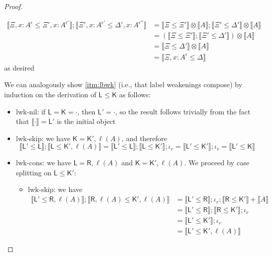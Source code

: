 \documentclass[acmsmall,screen,review]{acmart}
\newcommand{\mb}[1]{\ensuremath{\mathbf{#1}}}
\newcommand{\ms}[1]{\ensuremath{\mathsf{#1}}}
\newcommand{\thyp}[3]{#1 : {#2}^{#3}}
\newcommand{\brle}[1]{{\textsf{#1}}}
\newcommand{\dnt}[1]{\llbracket{#1}\rrbracket}
\begin{document}
\begin{proof}
\begin{itemize}
\begin{itemize}
\begin{equation}
\begin{aligned}
        \dnt{\Xi, \thyp{x}{A}{\epsilon} \leq \Xi', \thyp{x}{A}{\epsilon'}} ; 
        \dnt{\Xi', \thyp{x}{A}{\epsilon'} \leq \Delta', \thyp{x}{A}{\epsilon''}}
        &= \dnt{\Xi \leq \Xi'} \otimes \dnt{A} ; \dnt{\Xi' \leq \Delta'} \otimes \dnt{A} \\
        &= (\dnt{\Xi \leq \Xi'} ; \dnt{\Xi' \leq \Delta'}) \otimes \dnt{A} \\
        &= \dnt{\Xi \leq \Delta'} \otimes \dnt{A} \\
        &= \dnt{\Xi, \thyp{x}{A}{\epsilon} \leq \Delta}
        \end{aligned}
      \end{equation}
      as desired
    \end{itemize}
  \end{itemize}
  We can analogously show \ref{itm:lbwk} (i.e., that label weakenings compose) by induction on the
  derivation of $\ms{L} \leq \ms{K}$ as follows:
  \begin{itemize}
    \item \brle{lwk-nil}: if $\ms{L} = \ms{K} = \cdot$, then $\ms{L}' = \cdot$, so the result
    follows trivially from the fact that $\dnt{\cdot} = \mb{\ms{L}'}$ is the initial object
    \item \brle{lwk-skip}: we have $\ms{K} = \ms{K}', \ell(A)$, and therefore
    \begin{equation}
      \dnt{\ms{L}' \leq \ms{L}} ; \dnt{\ms{L} \leq \ms{K}', \ell(A)}
      = \dnt{\ms{L}' \leq \ms{L}} ; \dnt{\ms{L} \leq \ms{K}'} ; \iota_r
      = \dnt{\ms{L}' \leq \ms{K}'} ; \iota_r
      = \dnt{\ms{L}' \leq \ms{K}}
    \end{equation}
    \item \brle{lwk-cons}: we have $\ms{L} = \ms{R}, \ell(A)$ and $\ms{K} = \ms{K}', \ell(A)$. We
    proceed by case splitting on $\ms{L} \leq \ms{K}'$:
    \begin{itemize}
      \item \brle{lwk-skip}: we have
      \begin{equation}
        \begin{aligned}
        \dnt{\ms{L}' \leq \ms{R}, \ell(A)} ; \dnt{\ms{R}, \ell(A) \leq \ms{K}', \ell(A)}
        & = \dnt{\ms{L}' \leq \ms{R}} ; \iota_r ; \dnt{\ms{R} \leq \ms{K}'} + \dnt{A} \\
        & = \dnt{\ms{L}' \leq \ms{R}} ; \dnt{\ms{R} \leq \ms{K}'} ; \iota_r \\
        & = \dnt{\ms{L}' \leq \ms{K}'} ; \iota_r \\
        & = \dnt{\ms{L}' \leq \ms{K}', \ell(A)}

\end{aligned}
\end{equation}
\end{itemize}
\end{itemize}
\end{proof}
\end{document}
